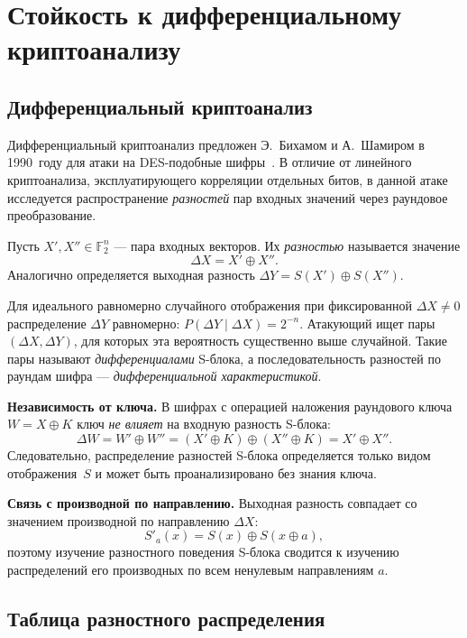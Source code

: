 \newpage
\section{Стойкость к дифференциальному криптоанализу}

\subsection{Дифференциальный криптоанализ}

Дифференциальный криптоанализ предложен Э.~Бихамом и А.~Шамиром в 1990~году
для атаки на DES-подобные шифры~\cite{biham1991}. В отличие от линейного
криптоанализа, эксплуатирующего корреляции отдельных битов, в данной атаке
исследуется распространение \emph{разностей} пар входных значений через
раундовое преобразование.

\begin{definition}
Пусть $X', X'' \in \mathbb{F}_2^n$ — пара входных векторов. Их
\emph{разностью} называется значение
\[
    \Delta X = X' \oplus X''.
\]
Аналогично определяется выходная разность $\Delta Y = S(X') \oplus S(X'')$.
\end{definition}

Для идеального равномерно случайного отображения при фиксированной
$\Delta X \neq 0$ распределение $\Delta Y$ равномерно:
$P(\Delta Y \mid \Delta X) = 2^{-n}$. Атакующий ищет пары
$(\Delta X, \Delta Y)$, для которых эта вероятность существенно выше
случайной. Такие пары называют \emph{дифференциалами} S-блока, а
последовательность разностей по раундам шифра — \emph{дифференциальной
характеристикой}.

\medskip
\textbf{Независимость от ключа.} В шифрах с операцией наложения раундового
ключа $W = X \oplus K$ ключ \emph{не влияет} на входную разность S-блока:
\[
    \Delta W = W' \oplus W'' = (X' \oplus K) \oplus (X'' \oplus K) = X' \oplus X''.
\]
Следовательно, распределение разностей S-блока определяется только видом
отображения~$S$ и может быть проанализировано без знания ключа.

\medskip
\textbf{Связь с производной по направлению.} Выходная разность совпадает со
значением производной по направлению $\Delta X$:
\[
    S'_a(x) = S(x) \oplus S(x \oplus a),
\]
поэтому изучение разностного поведения S-блока сводится к изучению
распределений его производных по всем ненулевым направлениям $a$.

\subsection{Таблица разностного распределения}

